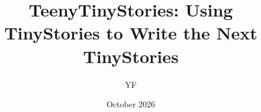 \documentclass{article}
\title{TeenyTinyStories: Using TinyStories to Write the Next TinyStories}
\author{YF}
\date{October 2026}
\newif\ifmarkup
\begin{document}
\maketitle

\ifmarkup
\begin{center}
\fbox{\parbox{0.92\linewidth}{\small\textbf{Review key.} \textbf{Bold} = added or rewritten text; \sout{strikethrough} = deleted text; \textbf{[[TODO: \dots]]} = content you need to supply. Abstract, Discussion, Limitations, Conclusion and References are comment-only outlines in the \LaTeX{} source. Delete this box (and set \texttt{\textbackslash markupfalse}) for a clean copy.}}
\end{center}
\fi

\end{document}
